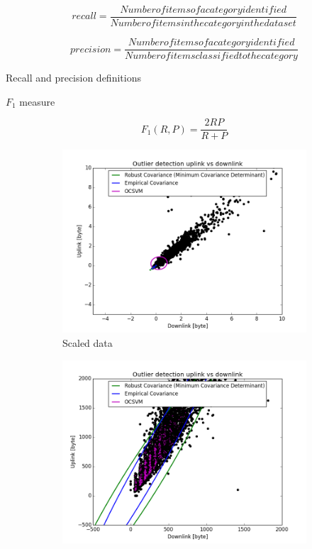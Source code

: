 \begin{algorithm}

$$ recall = \frac{Number of items of a category identified}{Number of items in the category in the dataset} $$

$$ precision = \frac{Number of items of a category identified}{Number of items classified to the category} $$

\caption{Recall and precision definitions}
\label{recallPrecision}
\end{algorithm}

\begin{algorithm}
\caption{$F_1$ measure}
\label{f1}
$$ F_1(R,P) = \frac{2RP}{R+P} $$
\end{algorithm}


\begin{figure}[hbp]
\centering
	\begin{subfigure}[b]{0.4\textwidth}
		\centering
		\includegraphics[scale=0.28]{figs/scaleUpVSDown.png}
        \caption{Scaled data}
        \label{fig:scaledUpDown}
	\end{subfigure}
	\begin{subfigure}[b]{0.4\textwidth}
		\centering
		\includegraphics[scale=0.28]{figs/unscaledUpVSDown.png}

\end{subfigure}
\end{figure}
